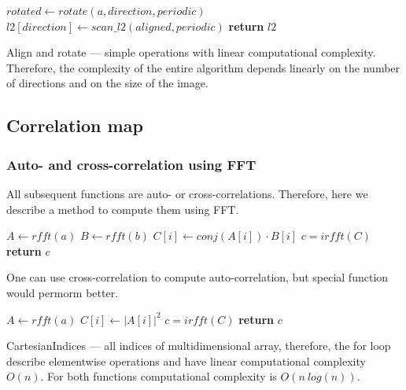 \documentclass[reprint,amsmath,amssymb,aps,pre,showkeys,showpacs,nofootinbib]{revtex4-1}
\begin{document}
\begin{algorithmic}[1]
      \State $rotated \gets rotate(a, direction, periodic)$
      \State $l2[direction] \gets scan\_l2(aligned, periodic)$
    \EndFor
    \State \textbf{return} $l2$
  \EndProcedure
\end{algorithmic}

Align and rotate --- simple operations with linear computational complexity.
Therefore, the complexity of the entire algorithm depends linearly 
on the number of directions and on the size of the image.

\subsection{Correlation map}

\subsubsection{Auto- and cross-correlation using FFT}

All subsequent functions are auto- or cross-correlations.
Therefore, here we describe a method to compute them using FFT.

\begin{algorithmic}[1]
    \State $A \gets rfft(a)$
    \State $B \gets rfft(b)$
      \State $C[i] \gets conj(A[i]) \cdot B[i]$
    \EndFor
    \State $c = irfft(C)$ 
    \State \textbf{return} $c$
  \EndProcedure
\end{algorithmic}

One can use cross-correlation to compute auto-correlation,
but special function would permorm better.

\begin{algorithmic}[1]
    \State $A \gets rfft(a)$
      \State $C[i] \gets |A[i]|^2$
    \EndFor
    \State $c = irfft(C)$ 
    \State \textbf{return} $c$
  \EndProcedure
\end{algorithmic}

CartesianIndices --- all indices of multidimensional array,
therefore, the for loop describe elementwise operations
and have linear computational complexity $O(n)$.
For both functions computational complexity is $O(n\ log(n))$.
\end{document}
